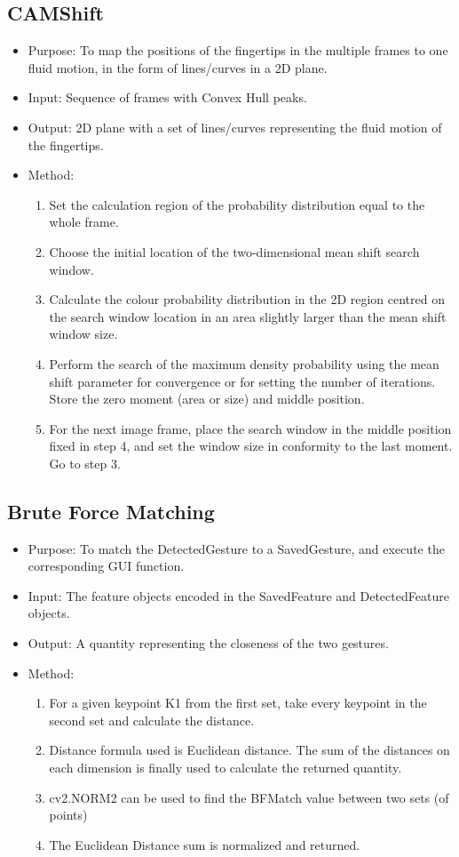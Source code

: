 \documentclass[11pt]{report}
\begin{document}
\subsection{CAMShift}
\begin{itemize}
    \item Purpose: To map the positions of the fingertips in the multiple frames to one fluid motion, in the form of lines/curves in a 2D plane.
    \item Input: Sequence of frames with Convex Hull peaks.
    \item Output: 2D plane with a set of lines/curves representing the fluid motion of the fingertips.
    \item Method:
    \begin{enumerate}
        \item Set the calculation region of the probability distribution equal to the whole frame.
        \item Choose the initial location of the two-dimensional mean shift search window.
        \item Calculate the colour probability distribution in the 2D region centred on the search window location in an area slightly larger than the mean shift window size.
        \item Perform the search of the maximum density probability using the mean shift parameter for convergence or for setting the number of iterations. Store the zero moment (area or size) and middle position.
        \item For the next image frame, place the search window in the middle position fixed in step 4, and set the window size in conformity to the last moment. Go to step 3. 
    \end{enumerate}
\end{itemize}
\subsection{Brute Force Matching}
\begin{itemize}
    \item Purpose: To match the DetectedGesture to a SavedGesture, and execute the corresponding GUI function.
    \item Input: The feature objects encoded in the SavedFeature and DetectedFeature objects.
    \item Output: A quantity representing the closeness of the two gestures.
    \item Method:
    \begin{enumerate}
        \item For a given keypoint K1 from the first set, take every keypoint in the second set and calculate the distance.
        \item Distance formula used is Euclidean distance. The sum of the distances on each dimension is finally used to calculate the returned quantity.
        \item cv2.NORM2 can be used to find the BFMatch value between two sets (of points)
        \item The Euclidean Distance sum is normalized and returned.
    \end{enumerate}
\end{itemize}
\end{document}
